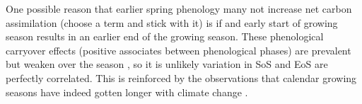 \documentclass[12 pt]{article}
\begin{document}
One possible reason that earlier spring phenology many not increase net carbon assimilation (choose a term and stick with it) is if and early start of growing season results in an earlier end of the growing season. These phenological carryover effects (positive associates between phenological phases) are prevalent \citep{} but weaken over the season \citep{}, so it is unlikely variation in SoS and EoS are perfectly correlated. This is reinforced by the observations that calendar growing seasons have indeed gotten longer with climate change \citep{}. 
\end{document}
